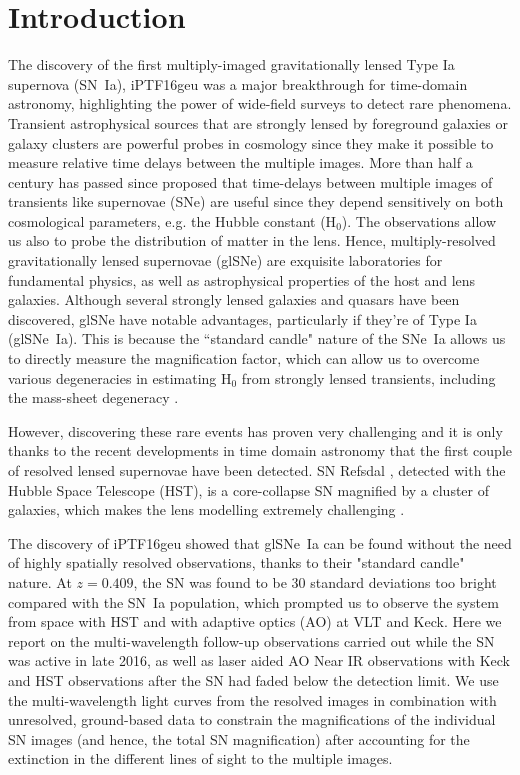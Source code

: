 \documentclass[a4paper,fleqn,usenatbib]{mnras}
\newcommand{\sn}{SN\xspace}
\newcommand{\snia}{SN~Ia\xspace}
\newcommand{\glsne}{glSNe\xspace}
\begin{document}


\section{Introduction}
The discovery of the first multiply-imaged gravitationally lensed Type Ia supernova (SN~Ia), iPTF16geu \citep[][hereafter G17]{2017Sci...356..291G} was a major breakthrough for time-domain astronomy, highlighting the power of wide-field surveys to detect rare phenomena.  Transient astrophysical sources that are strongly lensed by foreground galaxies or galaxy clusters are powerful probes in cosmology since they make it possible to measure relative time delays between the multiple images. More than half a century has passed since \citet{1964MNRAS.128..307R} proposed that time-delays between multiple images of transients like supernovae (SNe) are useful since they depend sensitively on both cosmological parameters, e.g. the Hubble constant (H$_0$). The observations allow us also to probe the distribution of matter in the lens. Hence, multiply-resolved gravitationally lensed supernovae (\glsne) are exquisite laboratories for fundamental physics, as well as astrophysical properties of the host and lens galaxies. Although several strongly lensed galaxies and quasars have been discovered, \glsne have notable advantages, particularly if they're of Type Ia (glSNe~Ia). This is because the ``standard candle" nature of the SNe~Ia allows us to directly measure the magnification factor, which can allow us to overcome various degeneracies in estimating H$_0$ from strongly lensed transients, including the mass-sheet degeneracy \citep{1985ApJ...289L...1F,2014A&A...564A.103S}.

However, discovering these rare events has proven very challenging and it is only thanks to the recent developments in time domain astronomy that the first couple of resolved lensed supernovae have been detected. SN Refsdal \citep{2015Sci...347.1123K}, detected with the Hubble Space Telescope (HST), is a core-collapse \sn magnified by a cluster of galaxies, which makes the lens modelling extremely challenging \citep{2018ApJ...860...94G}. 

The discovery of iPTF16geu showed that glSNe~Ia can be found without the need of highly spatially resolved observations, thanks to their "standard candle" nature. At $z=0.409$, the \sn was found to be 30 standard deviations too bright compared with the \snia population, which prompted us to observe the system from space with HST and with adaptive optics (AO) at VLT and Keck. Here we report on the multi-wavelength follow-up observations carried out while the \sn was active in late 2016, as well as laser aided AO Near IR observations with Keck and HST observations after the SN had faded below the detection limit.
We use the multi-wavelength light curves from the resolved images in combination with unresolved, ground-based data to constrain the magnifications of the individual SN images (and hence, the total SN magnification) after accounting for the extinction in the different lines of sight to the multiple images. 
 
\end{document}

